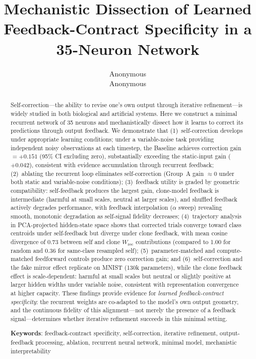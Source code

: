 \documentclass[10pt]{article}
\title{Mechanistic Dissection of Learned Feedback-Contract Specificity in a 35-Neuron Network}
\author{\name Anonymous \\
\addr Anonymous
}
\begin{document}
\maketitle

\begin{abstract}
Self-correction---the ability to revise one's own output through iterative refinement---is widely studied in both biological and artificial systems. Here we construct a minimal recurrent network of 35 neurons and mechanistically dissect how it learns to correct its predictions through output feedback. We demonstrate that (1)~self-correction develops under appropriate learning conditions; under a variable-noise task providing independent noisy observations at each timestep, the Baseline achieves correction gain $= +0.151$ (95\% CI excluding zero), substantially exceeding the static-input gain ($+0.042$), consistent with evidence accumulation through recurrent feedback; (2)~ablating the recurrent loop eliminates self-correction (Group~A gain $\approx 0$ under both static and variable-noise conditions); (3)~feedback utility is graded by geometric compatibility: self-feedback produces the largest gain, clone-model feedback is intermediate (harmful at small scales, neutral at larger scales), and shuffled feedback actively degrades performance, with feedback interpolation ($\alpha$ sweep) revealing smooth, monotonic degradation as self-signal fidelity decreases; (4)~trajectory analysis in PCA-projected hidden-state space shows that corrected trials converge toward class centroids under self-feedback but diverge under clone feedback, with mean cosine divergence of 0.73 between self and clone $W_\text{rec}$ contributions (compared to 1.00 for random and 0.36 for same-class resampled self); (5)~parameter-matched and compute-matched feedforward controls produce zero correction gain; and (6)~self-correction and the fake mirror effect replicate on MNIST (130k parameters), while the clone feedback effect is scale-dependent: harmful at small scales but neutral or slightly positive at larger hidden widths under variable noise, consistent with representation convergence at higher capacity. These findings provide evidence for \emph{learned feedback-contract specificity}: the recurrent weights are co-adapted to the model's own output geometry, and the continuous fidelity of this alignment---not merely the presence of a feedback signal---determines whether iterative refinement succeeds in this minimal setting.

\textbf{Keywords}: feedback-contract specificity, self-correction, iterative refinement, output-feedback processing, ablation, recurrent neural network, minimal model, mechanistic interpretability
\end{abstract}
\end{document}
